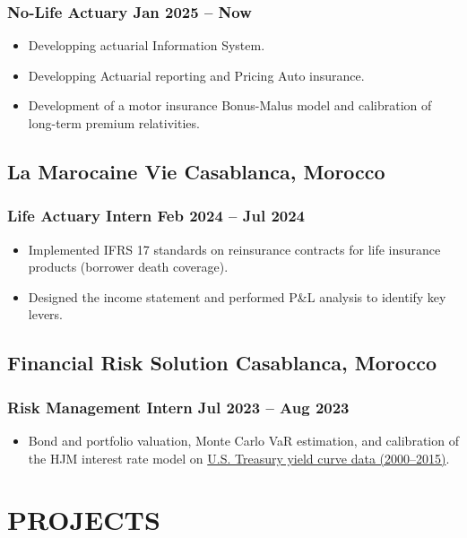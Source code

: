\documentclass[11pt]{amdresume}
\begin{document}
\subsubsection{No-Life Actuary \dotfill Jan 2025 – Now}
\begin{itemize}
\item Developping actuarial Information System. 
\item Developping Actuarial reporting and Pricing Auto insurance.
\item Development of a motor insurance Bonus-Malus model and calibration of long-term premium relativities.
\end{itemize}

\subsection{La Marocaine Vie \hfill Casablanca, Morocco}
\subsubsection{Life Actuary Intern \dotfill Feb 2024 – Jul 2024}
\begin{itemize}
\item Implemented IFRS 17 standards on reinsurance contracts for life insurance products (borrower death coverage).
\item Designed the income statement and performed P\&L analysis to identify key levers.
\end{itemize}

\subsection{Financial Risk Solution \hfill Casablanca, Morocco}
\subsubsection{Risk Management Intern \dotfill Jul 2023 – Aug 2023}
\begin{itemize}
\item Bond and portfolio valuation, Monte Carlo VaR estimation, and calibration of the HJM interest rate model on \href{https://www.federalreserve.gov/econres/feds/the-us-treasury-yield-curve-1961-to-the-present.htm}{U.S. Treasury yield curve data (2000–2015)}.
\end{itemize}

\section{PROJECTS}
\end{document}
